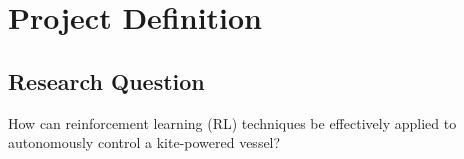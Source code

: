 



\section{Project Definition}

\subsection{Research Question}
How can reinforcement learning (RL) techniques be effectively applied to autonomously control a kite-powered vessel?

